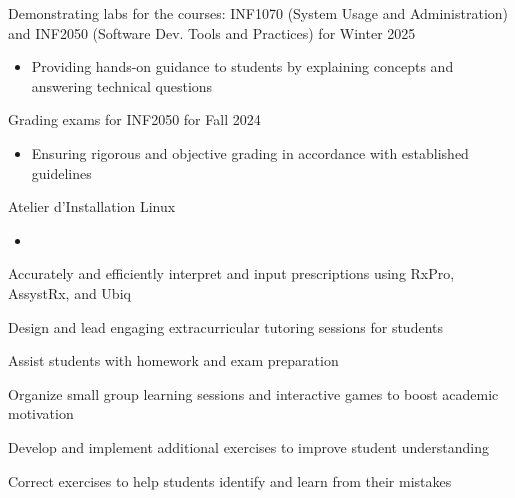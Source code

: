 \documentclass[letterpaper,10pt]{article}
\begin{document}
  \begin{resume_list}
    \item Demonstrating labs for the courses: INF1070 (System Usage and Administration) and INF2050 (Software Dev. Tools and Practices) for Winter 2025
    \begin{itemize}
    \item{Providing hands-on guidance to students by explaining concepts and answering technical questions}
    \end{itemize}
    \vspace{3pt}
    \item Grading exams for INF2050 for Fall 2024
    \begin{itemize}
    \item{Ensuring rigorous and objective grading in accordance with established guidelines}
    \end{itemize}
    \item Atelier d'Installation Linux
    \begin{itemize}
    \item{}
    \end{itemize}
  \end{resume_list}

  \begin{resume_list}
    \item Accurately and efficiently interpret and input prescriptions using RxPro, AssystRx, and Ubiq
  \end{resume_list}

  \begin{resume_list}
    \item Design and lead engaging extracurricular tutoring sessions for students
    \item Assist students with homework and exam preparation
    \item Organize small group learning sessions and interactive games to boost academic motivation
    \item Develop and implement additional exercises to improve student understanding
    \item Correct exercises to help students identify and learn from their mistakes
  \end{resume_list}
\end{document}
